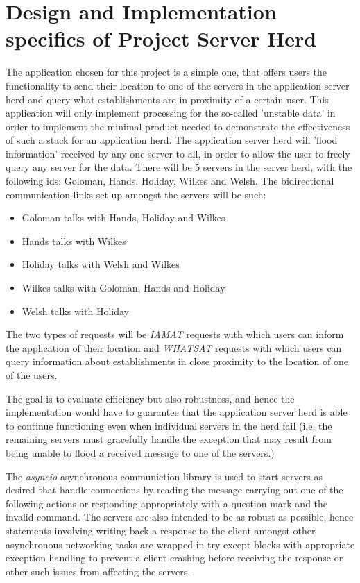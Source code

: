 \section{Design and Implementation specifics of Project Server Herd}
The application chosen for this project is a simple one, that offers users the functionality to send their location to one of the servers in the application server herd and query what establishments are in proximity of a certain user. This application will only implement processing for the so-called 'unstable data' in order to implement the minimal product needed to demonstrate the effectiveness of such a stack for an application herd. The application server herd will 'flood information' received by any one server to all, in order to allow the user to freely query any server for the data. There will be 5 servers in the server herd, with the following ids: Goloman, Hands, Holiday, Wilkes and Welsh. The bidirectional communication links set up amongst the servers will be such:
\begin{itemize}
\item Goloman talks with Hands, Holiday and Wilkes
\item Hands talks with Wilkes
\item Holiday talks with Welsh and Wilkes
\item Wilkes talks with Goloman, Hands and Holiday
\item Welsh talks with Holiday
\end{itemize}


\noindent The two types of requests will be \emph{IAMAT} requests with which users can inform the application of their location and \emph{WHATSAT} requests with which users can query information about establishments in close proximity to the location of one of the users. \newline

\noindent The goal is to evaluate efficiency but also robustness, and hence the implementation would have to guarantee that the application server herd is able to continue functioning even when individual servers in the herd fail (i.e. the remaining servers must gracefully handle the exception that may result from being unable to flood a received message to one of the servers.) \newline

\noindent The \emph{asyncio} asynchronous communiction library is used to start servers as desired that handle connections by reading the message carrying out one of the following actions or responding appropriately with a question mark and the invalid command. The servers are also intended to be as robust as possible, hence statements involving writing back a response to the client amongst other asynchronous networking tasks are wrapped in try except blocks with appropriate exception handling to prevent a client crashing before receiving the response or other such issues from affecting the servers.\newline

